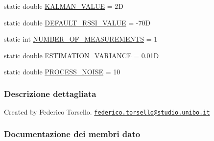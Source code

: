 \begin{DoxyCompactItemize}
static double \hyperlink{classit_1_1unibo_1_1torsello_1_1bluetoothpositioning_1_1constant_1_1KFilterConstansts_a6b01793427a35ab5da47686efeb87e92_a6b01793427a35ab5da47686efeb87e92}{K\+A\+L\+M\+A\+N\+\_\+\+V\+A\+L\+UE} = 2D
\item 
static double \hyperlink{classit_1_1unibo_1_1torsello_1_1bluetoothpositioning_1_1constant_1_1KFilterConstansts_a1f2a51a4c23f7cc42f602f641eaea368_a1f2a51a4c23f7cc42f602f641eaea368}{D\+E\+F\+A\+U\+L\+T\+\_\+\+R\+S\+S\+I\+\_\+\+V\+A\+L\+UE} = -\/70D
\item 
static int \hyperlink{classit_1_1unibo_1_1torsello_1_1bluetoothpositioning_1_1constant_1_1KFilterConstansts_a86eaaf60180d279244a49c4f0c874095_a86eaaf60180d279244a49c4f0c874095}{N\+U\+M\+B\+E\+R\+\_\+\+O\+F\+\_\+\+M\+E\+A\+S\+U\+R\+E\+M\+E\+N\+TS} = 1
\item 
static double \hyperlink{classit_1_1unibo_1_1torsello_1_1bluetoothpositioning_1_1constant_1_1KFilterConstansts_a286a9a856e4fe570d6d315039aa488cf_a286a9a856e4fe570d6d315039aa488cf}{E\+S\+T\+I\+M\+A\+T\+I\+O\+N\+\_\+\+V\+A\+R\+I\+A\+N\+CE} = 0.\+01D
\item 
static double \hyperlink{classit_1_1unibo_1_1torsello_1_1bluetoothpositioning_1_1constant_1_1KFilterConstansts_ab8b76f56fb1c22e0e48b01a31a5c8814_ab8b76f56fb1c22e0e48b01a31a5c8814}{P\+R\+O\+C\+E\+S\+S\+\_\+\+N\+O\+I\+SE} = 10
\end{DoxyCompactItemize}


\subsubsection{Descrizione dettagliata}
Created by Federico Torsello. \href{mailto:federico.torsello@studio.unibo.it}{\tt federico.\+torsello@studio.\+unibo.\+it} 

\subsubsection{Documentazione dei membri dato}
\hypertarget{classit_1_1unibo_1_1torsello_1_1bluetoothpositioning_1_1constant_1_1KFilterConstansts_a6696f4c8bc06209b08dd308248b2b048_a6696f4c8bc06209b08dd308248b2b048}{}\label{classit_1_1unibo_1_1torsello_1_1bluetoothpositioning_1_1constant_1_1KFilterConstansts_a6696f4c8bc06209b08dd308248b2b048_a6696f4c8bc06209b08dd308248b2b048} 
